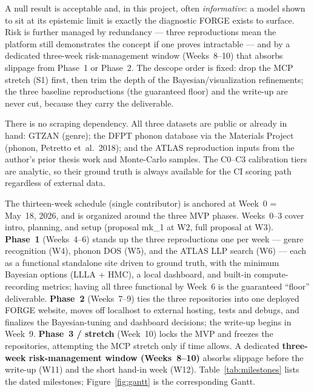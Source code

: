 A null result is acceptable and, in this project, often \emph{informative}: a model shown to sit at its epistemic limit is exactly the diagnostic FORGE exists to surface. Risk is further managed by redundancy --- three reproductions mean the platform still demonstrates the concept if one proves intractable --- and by a dedicated three-week risk-management window (Weeks~8--10) that absorbs slippage from Phase~1 or Phase~2. The descope order is fixed: drop the MCP stretch (S1) first, then trim the depth of the Bayesian/visualization refinements; the three baseline reproductions (the guaranteed floor) and the write-up are never cut, because they carry the deliverable.

There is no scraping dependency. All three datasets are public or already in hand: GTZAN (genre); the DFPT phonon database via the Materials Project (phonon, Petretto et~al.\ 2018); and the ATLAS reproduction inputs from the author's prior thesis work and Monte-Carlo samples. The C0--C3 calibration tiers are analytic, so their ground truth is always available for the CI scoring path regardless of external data.

\preparedby

The thirteen-week schedule (single contributor) is anchored at Week~0 = May~18, 2026, and is organized around the three MVP phases. Weeks~0--3 cover intro, planning, and setup (proposal mk\_1 at W2, full proposal at W3). \textbf{Phase~1} (Weeks~4--6) stands up the three reproductions one per week --- genre recognition (W4), phonon DOS (W5), and the ATLAS LLP search (W6) --- each as a functional standalone site driven to ground truth, with the minimum Bayesian options (LLLA + HMC), a local dashboard, and built-in compute-recording metrics; having all three functional by Week~6 is the guaranteed ``floor'' deliverable. \textbf{Phase~2} (Weeks~7--9) ties the three repositories into one deployed FORGE website, moves off localhost to external hosting, tests and debugs, and finalizes the Bayesian-tuning and dashboard decisions; the write-up begins in Week~9. \textbf{Phase~3 / stretch} (Week~10) locks the MVP and freezes the repositories, attempting the MCP stretch only if time allows. A dedicated \textbf{three-week risk-management window (Weeks~8--10)} absorbs slippage before the write-up (W11) and the short hand-in week (W12). Table~\ref{tab:milestones} lists the dated milestones; Figure~\ref{fig:gantt} is the corresponding Gantt.

